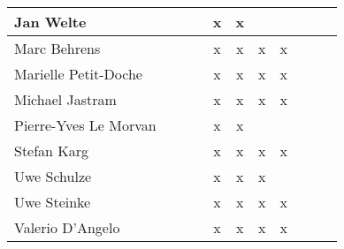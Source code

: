 \documentclass[a4paper, 11pt]{article}
\begin{document}
\begin{tabular}{|l|c|c|c|c||c|c|c||c|c|c|}
Jan Welte            &   &   &   & x & x &   &   \\\hline
Marc Behrens         &    &   &   & x & x & x & x \\\hline
Marielle Petit-Doche &   &   &   & x & x & x & x \\\hline
Michael Jastram      &   &   &   & x & x & x & x  \\\hline
Pierre-Yves Le Morvan &   &   &   & x & x &   &   \\\hline
Stefan Karg          &   &   &   & x & x & x & x \\\hline
Uwe Schulze          &   &   &   & x & x & x &   \\\hline
Uwe Steinke          &   &   &   & x & x & x & x \\\hline
Valerio D'Angelo     &   &   &   &x  & x & x & x \\\hline
\end{tabular}
\end{document}
